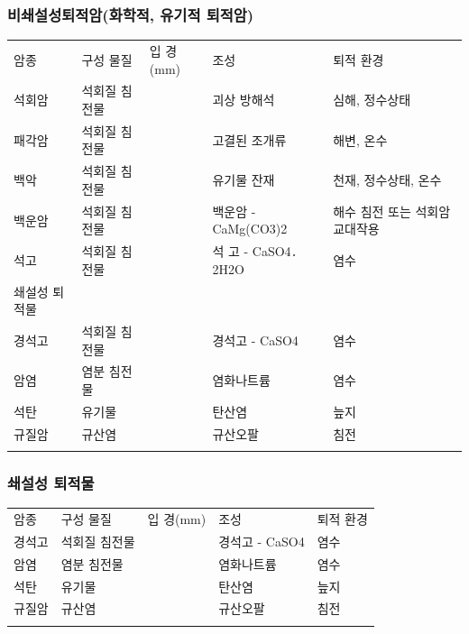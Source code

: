 \documentclass[12pt, a4paper, twoside]{book}
\begin{document}
			\subsubsection{비쇄설성퇴적암(화학적, 유기적 퇴적암)}
				\begin{tabu} to 1.0\textwidth { X[l, 2.0] X[l, 4.0] X[l, 4.0] X[l, 4.0] X[l, 4.0]}
				\tabucline[0.2ex]{-}		
				암종		&구성 물질		&입 경(mm)		&조성				&퇴적 환경 	\\
				\tabucline[0.1ex]{-}		

				석회암	&석회질 침전물		&				&괴상 방해석			&심해, 정수상태 \\
				패각암	&석회질 침전물		&				&고결된 조개류			&해변, 온수	\\
				백악		&석회질 침전물		&				&유기물 잔재			&천재, 정수상태, 온수 \\
				백운암	&석회질 침전물		&				&백운암 - CaMg(CO3)2	&해수 침전 또는 석회암 교대작용 \\
				석고		&석회질 침전물		&				&석 고 - CaSO4․2H2O	&염수	\\
				쇄설성 퇴적물\\
				경석고	&석회질 침전물		&				&경석고 - CaSO4		&염수\\
				암염		&염분 침전물		&				&염화나트륨			&염수 \\
				석탄		&유기물			&				&탄산염				&늪지\\
				규질암	&규산염			&				&규산오팔				&침전 \\
				
				
				\tabucline[0.1ex]{-}		
				\end{tabu} 

			\subsubsection{쇄설성 퇴적물}
				\begin{tabu} to 1.0\textwidth { X[l, 2.0] X[l, 4.0] X[l, 4.0] X[l, 4.0] X[l, 4.0]}
				\tabucline[0.2ex]{-}		
				암종		&구성 물질		&입 경(mm)		&조성				&퇴적 환경 	\\
				\tabucline[0.1ex]{-}		

				경석고	&석회질 침전물		&				&경석고 - CaSO4		&염수\\
				암염		&염분 침전물		&				&염화나트륨			&염수 \\
				석탄		&유기물			&				&탄산염				&늪지\\
				규질암	&규산염			&				&규산오팔				&침전 \\
				
				
				\tabucline[0.1ex]{-}		
				\end{tabu} 
\end{document}
